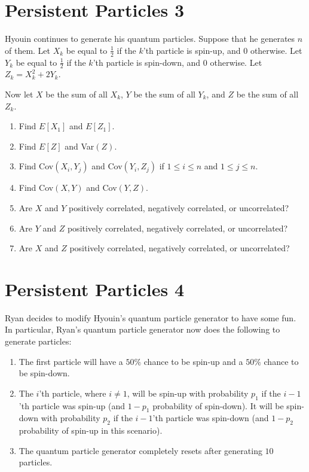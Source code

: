\documentclass{article}
\begin{document}
\vfill\vfill

\section{Persistent Particles 3}

Hyouin continues to generate his quantum particles. Suppose that he generates $n$ of them. Let $X_k$ be equal to $\frac{1}{2}$ if the $k$'th particle is spin-up, and $0$ otherwise. Let $Y_k$ be equal to $\frac{1}{2}$ if the $k$'th particle is spin-down, and $0$ otherwise. Let $Z_k = X_k^2 + 2Y_k$.

Now let $X$ be the sum of all $X_k$, $Y$ be the sum of all $Y_k$, and $Z$ be the sum of all $Z_k$.

\begin{enumerate}[label=(\alph*)]
\itemsep0em
    \item Find $E[X_1]$ and $E[Z_1]$.\vfill
    \item Find $E[Z]$ and Var$(Z)$.\vfill
    \item Find Cov$(X_i, Y_j)$ and Cov$(Y_i, Z_j)$ if $1 \leq i \leq n$ and $1 \leq j \leq n$.\vfill
    \item Find Cov$(X, Y)$ and Cov$(Y, Z)$.\vfill
    \item Are $X$ and $Y$ positively correlated, negatively correlated, or uncorrelated?\vfill
    \item Are $Y$ and $Z$ positively correlated, negatively correlated, or uncorrelated?\vfill
    \item Are $X$ and $Z$ positively correlated, negatively correlated, or uncorrelated?\vfill
\end{enumerate}

\newpage

\section{Persistent Particles 4}

Ryan decides to modify Hyouin's quantum particle generator to have some fun. In particular, Ryan's quantum particle generator now does the following to generate particles:

\begin{enumerate}
    \item The first particle will have a $50\%$ chance to be spin-up and a $50\%$ chance to be spin-down.
    \item The $i$'th particle, where $i \neq 1$, will be spin-up with probability $p_1$ if the $i-1$'th particle was spin-up (and $1-p_1$ probability of spin-down). It will be spin-down with probability $p_2$ if the $i-1$'th particle was spin-down (and $1-p_2$ probability of spin-up in this scenario).
    \item The quantum particle generator completely resets after generating $10$ particles.
\end{enumerate}
\end{document}
